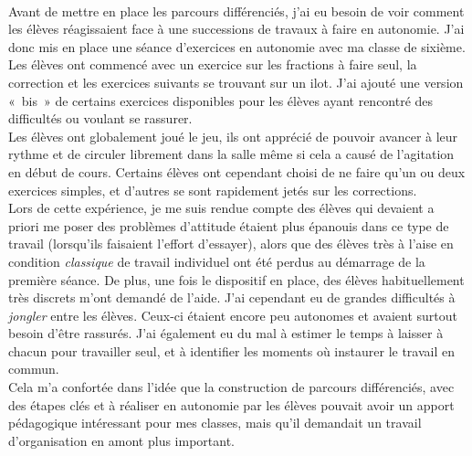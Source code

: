 \paragraph{}
Avant de mettre en place les parcours différenciés, j'ai eu besoin de voir comment les élèves réagissaient face à une successions de travaux à faire en autonomie. J'ai donc mis en place une séance d'exercices en autonomie avec ma classe de sixième. \\
Les élèves ont commencé avec un exercice sur les fractions à faire seul, la correction et les exercices suivants se trouvant sur un ilot. J'ai ajouté une version « bis » de certains exercices disponibles pour les élèves ayant rencontré des difficultés ou voulant se rassurer. \\
Les élèves ont globalement joué le jeu, ils ont apprécié de pouvoir avancer à leur  rythme et de circuler librement dans la salle même si cela a causé de l'agitation en début de cours. Certains élèves ont cependant choisi de ne faire qu'un ou deux exercices simples, et d'autres se sont rapidement jetés sur les corrections.\\
\newline
Lors de cette expérience, je me suis rendue compte des élèves qui devaient a priori me poser des problèmes d'attitude étaient plus épanouis dans ce type de travail (lorsqu'ils faisaient l'effort d'essayer), alors que des élèves très à l'aise en condition \emph{classique} de travail individuel ont été perdus au démarrage de la première séance. De plus, une fois le dispositif en place, des élèves habituellement très discrets m'ont demandé de l'aide. J'ai cependant eu de grandes difficultés à \emph{jongler} entre les élèves. Ceux-ci étaient encore peu autonomes et avaient surtout besoin d'être rassurés. J'ai également eu du mal à estimer le temps à laisser à chacun pour travailler seul, et à identifier les moments où instaurer le travail en commun.\\
Cela m'a confortée dans l'idée que la construction de parcours différenciés, avec des étapes clés et à réaliser en autonomie par les élèves pouvait avoir un apport pédagogique intéressant pour mes classes, mais qu'il demandait un travail d'organisation en amont plus important.

